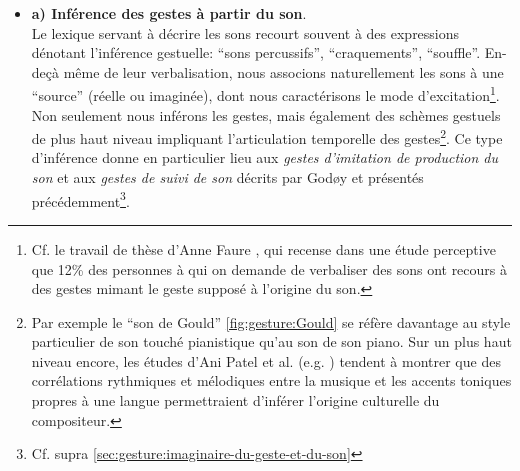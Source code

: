 \vspace{-1em}
\begin{itemize}[noitemsep]
	\item \textbf{a) Inférence des gestes à partir du son}.\\
	Le lexique servant à décrire les sons recourt souvent à des expressions dénotant l'inférence gestuelle: ``sons percussifs'', ``craquements'', ``souffle''. En-deçà même de leur verbalisation, nous associons naturellement les sons à une ``source'' (réelle ou imaginée), dont nous caractérisons le mode d'excitation\footnote{Cf. le travail de thèse d'Anne Faure \cite{faure_sons_2000}, qui recense dans une étude perceptive que 12\% des personnes à qui on demande de verbaliser des sons ont recours à des gestes mimant le geste supposé à l'origine du son.}. Non seulement nous inférons les gestes, mais également des schèmes gestuels de plus haut niveau impliquant l'articulation temporelle des gestes\footnote{Par exemple le ``son de Gould'' \ref{fig:gesture:Gould} se réfère davantage au style particulier de son touché pianistique qu'au son de son piano. Sur un plus haut niveau encore, les études d'Ani Patel et al. (e.g. \cite{patel_comparing_2006}) tendent à montrer que des corrélations rythmiques et mélodiques entre la musique et les accents toniques propres à une langue permettraient d'inférer l'origine culturelle du compositeur.}. Ce type d'inférence donne en particulier lieu aux \textit{gestes d'imitation de production du son} et aux \textit{gestes de suivi de son} décrits par Godøy et présentés précédemment\footnote{Cf. supra \ref{sec:gesture:imaginaire-du-geste-et-du-son}}.


\end{itemize}
